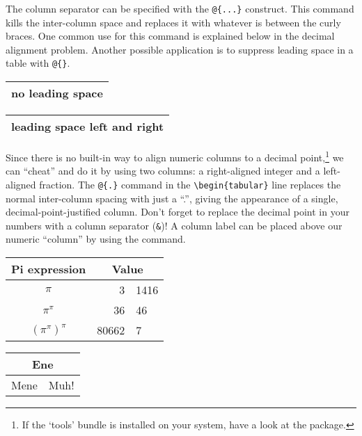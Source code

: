 The column separator can be specified with the \verb|@{...}|
construct. This command kills the inter-column space and replaces it
with whatever is between the curly braces.  One common use for
this command is explained below in the decimal alignment problem.
Another possible application is to suppress leading space in a table with
\verb|@{}|.

\begin{example}
\begin{tabular}{@{} l @{}}
\hline 
no leading space\\
\hline
\end{tabular}
\end{example}

\begin{example}
\begin{tabular}{l}
\hline
leading space left and right\\
\hline
\end{tabular}
\end{example}

%
%

 Since there is no built-in way to align
numeric columns to a decimal point,\footnote{If the `tools' bundle is
  installed on your system, have a look at the  package.}
we can ``cheat'' and do it by using two columns: a right-aligned
integer and a left-aligned fraction. The \verb|@{.}| command in the
\verb|\begin{tabular}| line replaces the normal inter-column spacing with
just a ``.'', giving the appearance of a single,
decimal-point-justified column.  Don't forget to replace the decimal
point in your numbers with a column separator (\verb|&|)! A column label
can be placed above our numeric ``column'' by using the
 command.
 
\begin{example}
\begin{tabular}{c r @{.} l}
Pi expression       &
\multicolumn{2}{c}{Value} \\
\hline
$\pi$               & 3&1416  \\
$\pi^{\pi}$         & 36&46   \\
$(\pi^{\pi})^{\pi}$ & 80662&7 \\
\end{tabular}
\end{example}

\begin{example}
\begin{tabular}{|c|c|}
\hline
\multicolumn{2}{|c|}{Ene} \\
\hline
Mene & Muh! \\
\hline
\end{tabular}
\end{example}

